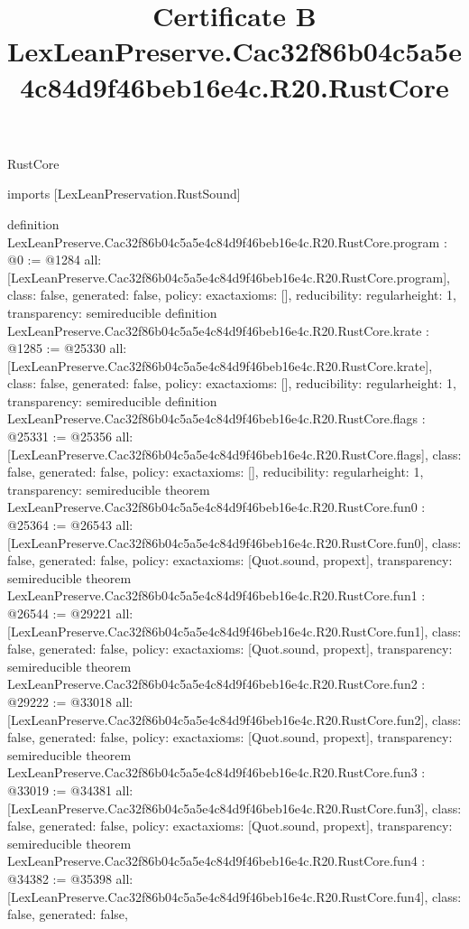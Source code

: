 \begin{lexlean}{RustCore}
\title{Certificate B LexLeanPreserve.Cac32f86b04c5a5e4c84d9f46beb16e4c.R20.RustCore}
\begin{coremodule}
imports [LexLeanPreservation.RustSound]

definition LexLeanPreserve.Cac32f86b04c5a5e4c84d9f46beb16e4c.R20.RustCore.program : @0 := @1284 {
  all: [LexLeanPreserve.Cac32f86b04c5a5e4c84d9f46beb16e4c.R20.RustCore.program],
  class: false,
  generated: false,
  policy: exact{axioms: []},
  reducibility: regular{height: 1},
  transparency: semireducible
}
definition LexLeanPreserve.Cac32f86b04c5a5e4c84d9f46beb16e4c.R20.RustCore.krate : @1285 := @25330 {
  all: [LexLeanPreserve.Cac32f86b04c5a5e4c84d9f46beb16e4c.R20.RustCore.krate],
  class: false,
  generated: false,
  policy: exact{axioms: []},
  reducibility: regular{height: 1},
  transparency: semireducible
}
definition LexLeanPreserve.Cac32f86b04c5a5e4c84d9f46beb16e4c.R20.RustCore.flags : @25331 := @25356 {
  all: [LexLeanPreserve.Cac32f86b04c5a5e4c84d9f46beb16e4c.R20.RustCore.flags],
  class: false,
  generated: false,
  policy: exact{axioms: []},
  reducibility: regular{height: 1},
  transparency: semireducible
}
theorem LexLeanPreserve.Cac32f86b04c5a5e4c84d9f46beb16e4c.R20.RustCore.fun0 : @25364 := @26543 {
  all: [LexLeanPreserve.Cac32f86b04c5a5e4c84d9f46beb16e4c.R20.RustCore.fun0],
  class: false,
  generated: false,
  policy: exact{axioms: [Quot.sound, propext]},
  transparency: semireducible
}
theorem LexLeanPreserve.Cac32f86b04c5a5e4c84d9f46beb16e4c.R20.RustCore.fun1 : @26544 := @29221 {
  all: [LexLeanPreserve.Cac32f86b04c5a5e4c84d9f46beb16e4c.R20.RustCore.fun1],
  class: false,
  generated: false,
  policy: exact{axioms: [Quot.sound, propext]},
  transparency: semireducible
}
theorem LexLeanPreserve.Cac32f86b04c5a5e4c84d9f46beb16e4c.R20.RustCore.fun2 : @29222 := @33018 {
  all: [LexLeanPreserve.Cac32f86b04c5a5e4c84d9f46beb16e4c.R20.RustCore.fun2],
  class: false,
  generated: false,
  policy: exact{axioms: [Quot.sound, propext]},
  transparency: semireducible
}
theorem LexLeanPreserve.Cac32f86b04c5a5e4c84d9f46beb16e4c.R20.RustCore.fun3 : @33019 := @34381 {
  all: [LexLeanPreserve.Cac32f86b04c5a5e4c84d9f46beb16e4c.R20.RustCore.fun3],
  class: false,
  generated: false,
  policy: exact{axioms: [Quot.sound, propext]},
  transparency: semireducible
}
theorem LexLeanPreserve.Cac32f86b04c5a5e4c84d9f46beb16e4c.R20.RustCore.fun4 : @34382 := @35398 {
  all: [LexLeanPreserve.Cac32f86b04c5a5e4c84d9f46beb16e4c.R20.RustCore.fun4],
  class: false,
  generated: false,
}
\end{coremodule}
\end{lexlean}
